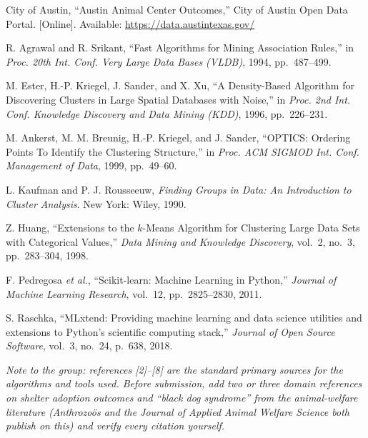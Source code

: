 \documentclass[11pt,a4paper]{article}
\begin{document}
\begin{enumerate}[label={[\arabic*]}]
  \item City of Austin, ``Austin Animal Center Outcomes,'' City of Austin Open Data
        Portal. [Online]. Available: \url{https://data.austintexas.gov/}
  \item R. Agrawal and R. Srikant, ``Fast Algorithms for Mining Association Rules,''
        in \emph{Proc. 20th Int. Conf. Very Large Data Bases (VLDB)}, 1994,
        pp.~487--499.
  \item M. Ester, H.-P. Kriegel, J. Sander, and X. Xu, ``A Density-Based Algorithm for
        Discovering Clusters in Large Spatial Databases with Noise,'' in
        \emph{Proc. 2nd Int. Conf. Knowledge Discovery and Data Mining (KDD)}, 1996,
        pp.~226--231.
  \item M. Ankerst, M. M. Breunig, H.-P. Kriegel, and J. Sander, ``OPTICS: Ordering
        Points To Identify the Clustering Structure,'' in \emph{Proc. ACM SIGMOD Int.
        Conf. Management of Data}, 1999, pp.~49--60.
  \item L. Kaufman and P. J. Rousseeuw, \emph{Finding Groups in Data: An Introduction
        to Cluster Analysis}. New York: Wiley, 1990.
  \item Z. Huang, ``Extensions to the $k$-Means Algorithm for Clustering Large Data
        Sets with Categorical Values,'' \emph{Data Mining and Knowledge Discovery},
        vol.~2, no.~3, pp.~283--304, 1998.
  \item F. Pedregosa \emph{et al.}, ``Scikit-learn: Machine Learning in Python,''
        \emph{Journal of Machine Learning Research}, vol.~12, pp.~2825--2830, 2011.
  \item S. Raschka, ``MLxtend: Providing machine learning and data science utilities
        and extensions to Python's scientific computing stack,'' \emph{Journal of Open
        Source Software}, vol.~3, no.~24, p.~638, 2018.
\end{enumerate}

\vspace{6pt}
\noindent\footnotesize\emph{Note to the group: references [2]--[8] are the standard
primary sources for the algorithms and tools used. Before submission, add two or three
domain references on shelter adoption outcomes and ``black dog syndrome'' from the
animal-welfare literature (\emph{Anthrozo\"os} and the \emph{Journal of Applied Animal
Welfare Science} both publish on this) and verify every citation yourself.}
\end{document}
